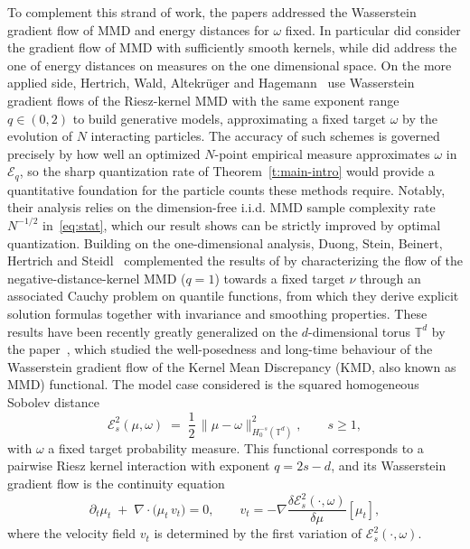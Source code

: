 \documentclass[12pt,a4paper,oneside]{amsart}
\theoremstyle{plain}
\theoremstyle{definition}
\numberwithin{equation}{section}
\numberwithin{figure}{section}
\numberwithin{table}{section}
\theoremstyle{remark}
\begin{document}
To complement this strand of work, the papers \cite{fornasier2013consistency, difrancesco2014asymptotic} addressed the Wasserstein gradient flow of MMD and energy distances for $\omega$ fixed. In particular \cite{fornasier2013consistency} did consider the gradient flow of MMD with sufficiently smooth kernels, while \cite{difrancesco2014asymptotic} did address the one of energy distances on measures on the one dimensional space. 
On the more applied side, Hertrich, Wald, Altekr\"uger and Hagemann~\cite{hertrich2024generative}
use Wasserstein gradient flows of the Riesz-kernel MMD with the same exponent range
$q\in(0,2)$ to build generative models, approximating a fixed target $\omega$ by the
evolution of $N$ interacting particles. The accuracy of such schemes is governed precisely
by how well an optimized $N$-point empirical measure approximates $\omega$ in $\mathcal{E}_q$,
so the sharp quantization rate of Theorem~\ref{t:main-intro} would provide a quantitative
foundation for the particle counts these methods require. Notably, their analysis relies on
the dimension-free i.i.d. MMD sample complexity rate $N^{-1/2}$ in~\eqref{eq:stat}, which our result shows can be
strictly improved by optimal quantization.
Building on the one-dimensional analysis, Duong, Stein, Beinert, Hertrich and
Steidl~\cite{duong2026wasserstein} complemented the results of \cite{difrancesco2014asymptotic} by characterizing the flow of the negative-distance-kernel MMD
($q=1$) towards a fixed target $\nu$ through an associated Cauchy problem on quantile functions,
from which they derive explicit solution formulas together with invariance and smoothing
properties.
These results have been recently greatly generalized on the $d$-dimensional torus $\mathbb T^d$  by the paper~\cite{chizat2026quantitative}, which studied the well-posedness and long-time
behaviour of the Wasserstein gradient flow of the Kernel Mean Discrepancy (KMD,
also known as MMD) functional. The model case considered is the squared homogeneous Sobolev distance
\[
  \mathcal{E}_s^2(\mu,\omega)
  \;=\;
  \frac{1}{2}\,\|\mu - \omega\|_{{H}_0^{-s}(\mathbb T^d)}^2,
  \qquad s \geq 1,
\]
 with $\omega$ a fixed target probability measure.
This functional corresponds to a pairwise Riesz kernel interaction with exponent
$q = 2s - d$, and its Wasserstein gradient flow is the continuity equation
\[
  \partial_t \mu_t
  \;+\;
  \nabla \cdot \bigl(\mu_t \, v_t\bigr) = 0,
  \qquad
  v_t = -\nabla \frac{\delta \mathcal{E}_s^2(\cdot,\omega)}{\delta \mu}[\mu_t],
\]
where the velocity field $v_t$ is determined by the first variation of
$\mathcal{E}_s^2(\cdot,\omega)$.
 
\end{document}
